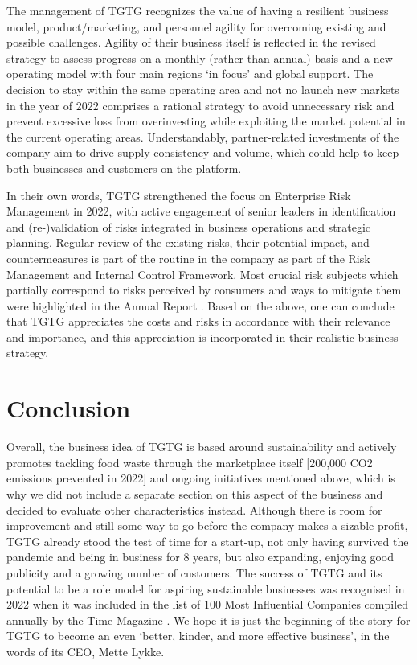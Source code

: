 \documentclass{article}
\begin{document}
The management of TGTG recognizes the value of having a resilient business
model, product/marketing, and personnel agility for overcoming existing and
possible challenges. Agility of their business itself is reflected in the
revised strategy to assess progress on a monthly (rather than annual) basis and
a new operating model with four main regions ‘in focus’ and global support. The
decision to stay within the same operating area and not no launch new markets
in the year of 2022 comprises a rational strategy to avoid unnecessary risk and
prevent excessive loss from overinvesting while exploiting the market potential
in the current operating areas. Understandably, partner-related investments of
the company aim to drive supply consistency and volume, which could help to
keep both businesses and customers on the platform.

In their own words, TGTG strengthened the focus on Enterprise Risk Management
in 2022, with active engagement of senior leaders in identification and
(re-)validation of risks integrated in business operations and strategic
planning. Regular review of the existing risks, their potential impact, and
countermeasures is part of the routine in the company as part of the Risk
Management and Internal Control Framework. Most crucial risk subjects which
partially correspond to risks perceived by consumers \cite{fraccascia} and ways
to mitigate them were highlighted in the Annual Report \cite{impact}. Based on
the above, one can conclude that TGTG appreciates the costs and risks in
accordance with their relevance and importance, and this appreciation is
incorporated in their realistic business strategy.

\section{Conclusion}

Overall, the business idea of TGTG is based around sustainability and actively
promotes tackling food waste through the marketplace itself  [200,000 CO2
emissions prevented in 2022] and ongoing initiatives mentioned above, which is
why we did not include a separate section on this aspect of the business and
decided to evaluate other characteristics instead. Although there is room for
improvement and still some way to go before the company makes a sizable profit,
TGTG already stood the test of time for a start-up, not only having survived
the pandemic and being in business for 8 years, but also expanding, enjoying
good publicity and a growing number of customers. The success of TGTG and its
potential to be a role model for aspiring sustainable businesses was recognised
in 2022 when it was included in the list of 100 Most Influential Companies
compiled annually by the Time Magazine \cite{reduce}. We hope it is just the beginning
of the story for TGTG to become an even ‘better, kinder, and more effective
business’, in the words of its CEO, Mette Lykke.  
\end{document}
